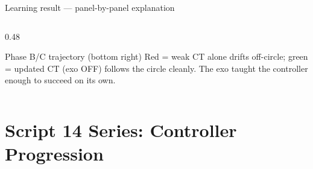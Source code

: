 \documentclass[10pt,aspectratio=169]{beamer}
\begin{document}
\begin{frame}{Learning result --- panel-by-panel explanation}
\begin{columns}[T,onlytextwidth]
\begin{column}{0.48\textwidth}
\vspace{0.3cm}
\begin{block}{Phase B/C trajectory (bottom right)}
Red = weak CT alone drifts off-circle;
green = updated CT (exo OFF) follows the circle cleanly.
The exo taught the controller enough to succeed on its own.
\end{block}
\end{column}
\end{columns}
\end{frame}

\section{Script 14 Series: Controller Progression}
\end{document}
